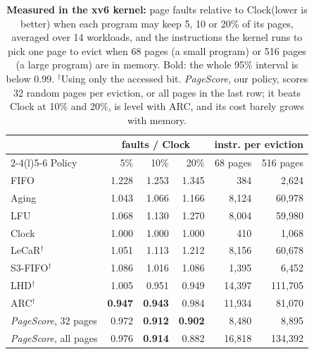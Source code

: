 \documentclass{article}
\newcommand{\clock}{Clock\xspace}
\DeclareRobustCommand{\pagescore}{\textit{PageScore}}
\begin{document}
\begin{table}[!b]
\caption{\textbf{Measured in the xv6 kernel:} page faults relative to \clock (lower is better) when each program may keep 5, 10 or 20\% of its pages, averaged over 14 workloads, and the instructions the kernel runs to pick one page to evict when 68 pages (a small program) or 516 pages (a large program) are in memory. Bold: the whole 95\% interval is below 0.99. $^\dagger$Using only the accessed bit. \pagescore{}, our policy, scores 32 random pages per eviction, or all pages in the last row; it beats \clock at 10\% and 20\%, is level with ARC, and its cost barely grows with memory.}
\label{tab:teaser}
\vskip 0.1in
\begin{center}
\begin{small}
\setlength{\tabcolsep}{2.5pt}
\begin{tabular}{@{}lrrrrr@{}}
\toprule
 & \multicolumn{3}{c}{faults / \clock} & \multicolumn{2}{c}{instr. per eviction} \\
\cmidrule(lr){2-4}\cmidrule(l){5-6}
Policy & 5\% & 10\% & 20\% & 68 pages & 516 pages \\
\midrule
FIFO                 & 1.228 & 1.253 & 1.345 & 384    & 2,624 \\
Aging                & 1.043 & 1.066 & 1.166 & 8,124  & 60,978 \\
LFU                  & 1.068 & 1.130 & 1.270 & 8,004  & 59,980 \\
\clock               & 1.000 & 1.000 & 1.000 & 410    & 1,068 \\
LeCaR$^\dagger$      & 1.051 & 1.113 & 1.212 & 8,156  & 60,678 \\
S3-FIFO$^\dagger$    & 1.086 & 1.016 & 1.086 & 1,395  & 6,452 \\
LHD$^\dagger$        & 1.005 & 0.951 & 0.949 & 14,397 & 111,705 \\
ARC$^\dagger$        & \textbf{0.947} & \textbf{0.943} & 0.984 & 11,934 & 81,070 \\
\midrule
\pagescore{}, 32 pages & 0.972 & \textbf{0.912} & \textbf{0.902} & 8,480 & 8,895 \\
\pagescore{}, all pages & 0.976 & \textbf{0.914} & 0.882 & 16,818 & 134,392 \\
\bottomrule
\end{tabular}
\end{small}
\end{center}
\vskip -0.1in
\end{table}
\end{document}
